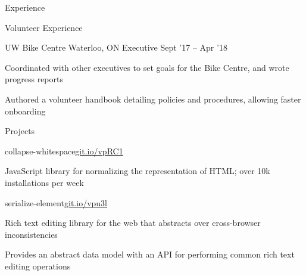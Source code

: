 \documentclass{resume} %
\begin{document}
\begin{rSection}{Experience}
\end{rSection}


\begin{rSection}{Volunteer Experience}
  \begin{rSubsection}{UW Bike Centre}
                     {Waterloo, ON}
                     {Executive}
                     {Sept '17 -- Apr '18}
    \item Coordinated with other executives to set goals for the Bike Centre, and wrote progress reports
    \item Authored a volunteer handbook detailing policies and procedures, allowing faster onboarding
  \end{rSubsection}
\end{rSection}


\begin{rSection}{Projects}
  \begin{rSubsection}{collapse-whitespace}{\href{https://git.io/vpRC1}{git.io/vpRC1}}{}{}
    \item JavaScript library for normalizing the representation of HTML; over 10k installations per week
  \end{rSubsection}

  \begin{rSubsection}{serialize-element}{\href{https://git.io/vpu3l}{git.io/vpu3l}}{}{}
    \item Rich text editing library for the web that abstracts over cross-browser inconsistencies
    \item Provides an abstract data model with an API for performing common rich text editing operations
  \end{rSubsection}

\end{rSection}
\end{document}
